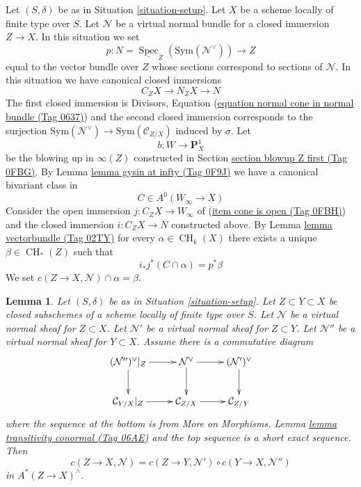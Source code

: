 \documentclass{amsart}
\theoremstyle{plain}
\newtheorem{lemma}[subsection]{Lemma}
\theoremstyle{definition}
\theoremstyle{remark}
\numberwithin{equation}{subsection}
\def\Spec{\mathop{\mathrm{Spec}}}
\def\CH{\mathop{\mathrm{CH}}\nolimits}
\begin{document}
\noindent
Let $(S, \delta)$ be as in Situation \ref{situation-setup}. Let $X$ be a scheme
locally of finite type over $S$. Let $\mathcal{N}$ be a virtual normal bundle
for a closed immersion $Z \to X$. In this situation we set
$$
p : N = \underline{\Spec}_Z(\text{Sym}(\mathcal{N}^\vee)) \longrightarrow Z
$$
equal to the vector bundle over $Z$
whose sections correspond to sections of $\mathcal{N}$.
In this situation we have canonical closed immersions
$$
C_ZX \longrightarrow N_ZX \longrightarrow N
$$
The first closed immersion is Divisors, Equation
(\href{https://stacks.math.columbia.edu/tag/0637}{equation normal cone in normal bundle (Tag 0637)})
and the second closed immersion corresponds to the surjection
$\text{Sym}(\mathcal{N}^\vee) \to \text{Sym}(\mathcal{C}_{Z/X})$
induced by $\sigma$.
Let
$$
b : W \longrightarrow \mathbf{P}^1_X
$$
be the blowing up in $\infty(Z)$ constructed in
Section \href{https://stacks.math.columbia.edu/tag/0FBG}{section blowup Z first (Tag 0FBG)}. By
Lemma \href{https://stacks.math.columbia.edu/tag/0F9J}{lemma gysin at infty (Tag 0F9J)}
we have a canonical bivariant class in
$$
C \in A^0(W_\infty \to X)
$$
Consider the open immersion $j : C_ZX \to W_\infty$ of
(\href{https://stacks.math.columbia.edu/tag/0FBH}{item cone is open (Tag 0FBH)}) and the closed immersion
$i : C_ZX \to N$ constructed above. By Lemma \href{https://stacks.math.columbia.edu/tag/02TY}{lemma vectorbundle (Tag 02TY)}
for every $\alpha \in \CH_k(X)$ there exists a unique
$\beta \in \CH_*(Z)$ such that
$$
i_*j^*(C \cap \alpha) = p^*\beta
$$
We set $c(Z \to X, \mathcal{N}) \cap \alpha = \beta$.


\begin{lemma}
\label{lemma-gysin-composition}
Let $(S, \delta)$ be as in Situation \ref{situation-setup}.
Let $Z \subset Y \subset X$ be closed subschemes of a scheme locally
of finite type over $S$.
Let $\mathcal{N}$ be a virtual normal sheaf for $Z \subset X$.
Let $\mathcal{N}'$ be a virtual normal sheaf for $Z \subset Y$.
Let $\mathcal{N}''$ be a virtual normal sheaf for $Y \subset X$.
Assume there is a commutative diagram
$$
\xymatrix{
(\mathcal{N}'')^\vee|_Z \ar[r] \ar[d] &
\mathcal{N}^\vee \ar[r] \ar[d] &
(\mathcal{N}')^\vee \ar[d] \\
\mathcal{C}_{Y/X}|_Z \ar[r] &
\mathcal{C}_{Z/X} \ar[r] &
\mathcal{C}_{Z/Y}
}
$$
where the sequence at the bottom is from More on Morphisms, Lemma
\href{https://stacks.math.columbia.edu/tag/06AE}{lemma transitivity conormal (Tag 06AE)} and the top
sequence is a short exact sequence. Then
$$
c(Z \to X, \mathcal{N}) =
c(Z \to Y, \mathcal{N}') \circ c(Y \to X, \mathcal{N}'')
$$
in $A^*(Z \to X)^\wedge$.
\end{lemma}
\end{document}
